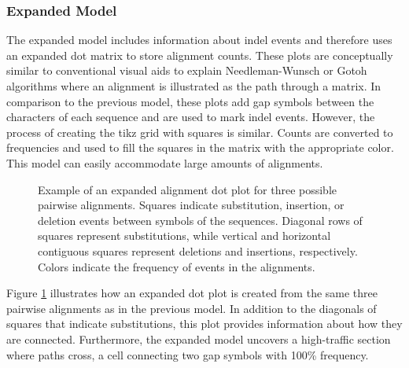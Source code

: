 \subsubsection{Expanded Model}

The expanded model includes information about indel events and therefore uses an expanded dot matrix to store alignment counts. These plots are conceptually similar to conventional visual aids to explain Needleman-Wunsch \citep{Needleman1970} or Gotoh \citep{gotoh_1982} algorithms where an alignment is illustrated as the path through a matrix. In comparison to the previous model, these plots add gap symbols between the characters of each sequence and are used to mark indel events. However, the process of creating the tikz grid with squares is similar. Counts are converted to frequencies and used to fill the squares in the matrix with the appropriate color. This model can easily accommodate large amounts of alignments.

\begin{figure}[!ht]
    \centering
    \begin{subfigure}[c]{0.2\textwidth}
        \centering
        \hspace*{-2em}\scalebox{0.8}{}
        \vspace*{-1.5em}\caption{}
     \end{subfigure}
     \hspace{3.2em}
    \begin{subfigure}[c]{0.5\textwidth}
        \centering
        \resizebox{1.3\textwidth}{!}{}
        \caption{}
     \end{subfigure}
    \caption[Expanded Dot Plot Model]{Example of an expanded alignment dot plot for three possible pairwise alignments. Squares indicate substitution, insertion, or deletion events between symbols of the sequences. Diagonal rows of squares represent substitutions, while vertical and horizontal contiguous squares represent deletions and insertions, respectively. Colors indicate the frequency of events in the alignments.}
    \label{fig:expanded}
\end{figure}

Figure \ref{fig:expanded} illustrates how an expanded dot plot is created from the same three pairwise alignments as in the previous model. In addition to the diagonals of squares that indicate substitutions, this plot provides information about how they are connected. Furthermore, the expanded model uncovers a high-traffic section where paths cross, a cell connecting two gap symbols with 100\% frequency.

